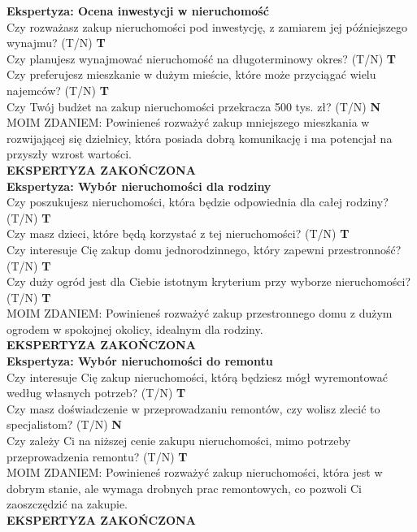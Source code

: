\noindent \textbf{Ekspertyza: Ocena inwestycji w nieruchomość}\\
\noindent Czy rozważasz zakup nieruchomości pod inwestycję, z zamiarem jej późniejszego wynajmu? (T/N) \textbf{T} \\
\noindent Czy planujesz wynajmować nieruchomość na długoterminowy okres? (T/N) \textbf{T} \\
\noindent Czy preferujesz mieszkanie w dużym mieście, które może przyciągać wielu najemców? (T/N) \textbf{T} \\
\noindent Czy Twój budżet na zakup nieruchomości przekracza 500 tys. zł? (T/N) \textbf{N} \\
MOIM ZDANIEM: Powinieneś rozważyć zakup mniejszego mieszkania w rozwijającej się dzielnicy, która posiada dobrą komunikację i ma potencjał na przyszły wzrost wartości.\\
\textbf{EKSPERTYZA ZAKOŃCZONA}\\

\noindent \textbf{Ekspertyza: Wybór nieruchomości dla rodziny}\\
\noindent Czy poszukujesz nieruchomości, która będzie odpowiednia dla całej rodziny? (T/N) \textbf{T} \\
\noindent Czy masz dzieci, które będą korzystać z tej nieruchomości? (T/N) \textbf{T} \\
\noindent Czy interesuje Cię zakup domu jednorodzinnego, który zapewni przestronność? (T/N) \textbf{T} \\
\noindent Czy duży ogród jest dla Ciebie istotnym kryterium przy wyborze nieruchomości? (T/N) \textbf{T} \\
MOIM ZDANIEM: Powinieneś rozważyć zakup przestronnego domu z dużym ogrodem w spokojnej okolicy, idealnym dla rodziny.\\
\textbf{EKSPERTYZA ZAKOŃCZONA}\\

\noindent \textbf{Ekspertyza: Wybór nieruchomości do remontu}\\
\noindent Czy interesuje Cię zakup nieruchomości, którą będziesz mógł wyremontować według własnych potrzeb? (T/N) \textbf{T} \\
\noindent Czy masz doświadczenie w przeprowadzaniu remontów, czy wolisz zlecić to specjalistom? (T/N) \textbf{N} \\
\noindent Czy zależy Ci na niższej cenie zakupu nieruchomości, mimo potrzeby przeprowadzenia remontu? (T/N) \textbf{T} \\
MOIM ZDANIEM: Powinieneś rozważyć zakup nieruchomości, która jest w dobrym stanie, ale wymaga drobnych prac remontowych, co pozwoli Ci zaoszczędzić na zakupie.\\
\textbf{EKSPERTYZA ZAKOŃCZONA}\\

